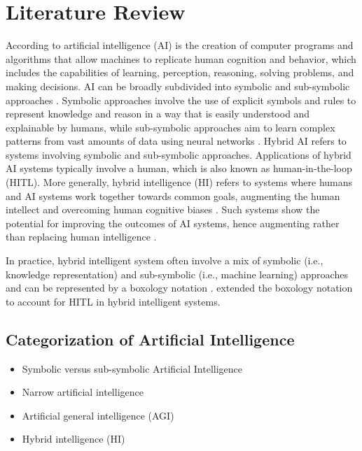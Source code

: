 \section{Literature Review}
\label{sec:literature}

According to \cite{russel2010} artificial intelligence (AI) is the creation of computer programs and algorithms
that allow machines to replicate human cognition and behavior, which includes the capabilities of learning, perception,
reasoning, solving problems, and making decisions. AI can be broadly subdivided into symbolic and sub-symbolic approaches
\citep{eliasmithSymbolicSubsymbolic2006}. Symbolic approaches involve the use of explicit symbols and rules to 
represent knowledge and reason in a way that is easily understood and explainable by humans, while sub-symbolic
approaches aim to learn complex patterns from vast amounts of data using neural networks
\citep{ilkouSymbolicVsSubsymbolic2020}. Hybrid AI refers to systems involving symbolic and sub-symbolic approaches.
Applications of hybrid AI systems typically involve a human, which is also known as human-in-the-loop (HITL). 
More generally,  hybrid intelligence (HI) refers to systems where humans and AI systems work together towards common goals,
augmenting the human intellect and overcoming human cognitive biases \citep{akataResearchAgendaHybrid2020}.
Such systems show the  potential for improving the outcomes of AI systems, hence augmenting rather than replacing
human intelligence \cite[p. 19]{akataResearchAgendaHybrid2020}.

In practice, hybrid intelligent system often involve a mix of symbolic (i.e., knowledge representation) and
sub-symbolic (i.e., machine learning) approaches and can be represented by a boxology notation
\citep{harmelenBoxologyDesignPatterns2019,vanbekkumModularDesignPatterns2021}.
\cite{witschelVisualizationPatternsHybrid2021} extended the boxology notation to account for HITL in hybrid
intelligent systems.




\subsection{Categorization of Artificial Intelligence}

\begin{itemize}
    \item Symbolic versus sub-symbolic Artificial Intelligence
    \item Narrow artificial intelligence
    \item Artificial general intelligence (AGI)
    \item Hybrid intelligence (HI)
\end{itemize}





